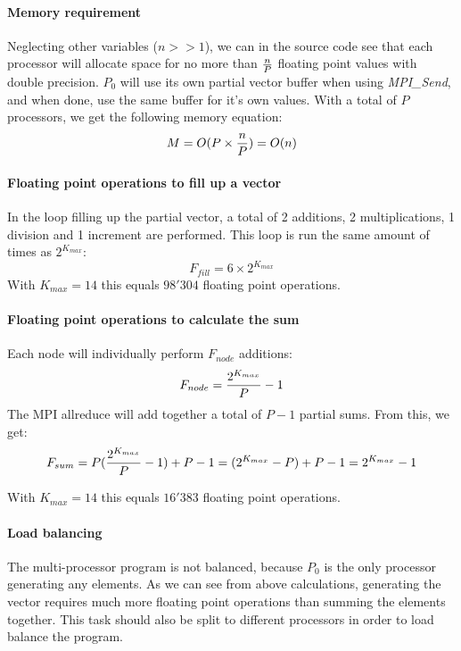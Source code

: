 \documentclass{article}
\begin{document}
\paragraph{Memory requirement}
Neglecting other variables ($n >> 1$), we can in the source code see that each processor will allocate space for no more than $n \over P$ floating point values with double precision. $P_0$ will use its own partial vector buffer when using \emph{MPI\_Send}, and when done, use the same buffer for it's own values. With a total of $P$ processors, we get the following memory equation:
\begin{equation}
	M = O(P \times {n \over P} ) = O(n)
\end{equation}

\paragraph{Floating point operations to fill up a vector}
In the loop filling up the partial vector, a total of 2 additions, 2 multiplications, 1 division and 1 increment are performed. This loop is run the same amount of times as $2^{K_{max}}$:
\begin{equation}
	F_{fill} = 6 \times 2^{K_{max}}
\end{equation}
With $K_{max}=14$ this equals $98'304$ floating point operations.


\paragraph{Floating point operations to calculate the sum}
Each node will individually perform $F_{node}$ additions:
\begin{equation}
	F_{node} = {2^{K_{max}} \over P} - 1
\end{equation}
The MPI allreduce will add together a total of $P-1$ partial sums. From this, we get:
\begin{equation}
	F_{sum} = P({2^{K_{max}} \over P} - 1) + P -1 = (2^{K_{max}} - P) + P -1 = 2^{K_{max}} - 1
\end{equation}

With $K_{max}=14$ this equals $16'383$ floating point operations.



\paragraph{Load balancing}
The multi-processor program is not balanced, because $P_0$ is the only processor generating any elements. As we can see from above calculations, generating the vector requires much more floating point operations than summing the elements together. This task should also be split to different processors in order to load balance the program.
\end{document}
